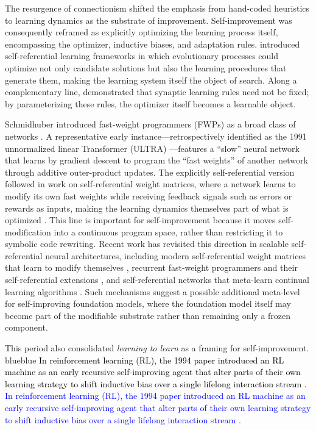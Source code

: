 \documentclass{article}
\let\oldtextcolor\textcolor
\renewcommand{\textcolor}[2]{
  \def\temp{#1}
  \def\red{blue}
  \ifx\temp\red
    \oldtextcolor{black}{#2}
  \else
    \oldtextcolor{#1}{#2}
  \fi
}
\begin{document}
The resurgence of connectionism shifted the emphasis from hand-coded heuristics to learning dynamics as the substrate of improvement. 
Self-improvement was consequently reframed as explicitly optimizing the learning process itself, encompassing the optimizer, inductive biases, and adaptation rules. \citet{schmidhuber1987selfreferential} introduced self-referential learning frameworks in which evolutionary processes could optimize not only candidate solutions but also the learning procedures that generate them, making the learning system itself the object of search. Along a complementary line, \citet{bengio1990learning}  demonstrated that synaptic learning rules need not be fixed; by parameterizing these rules, the optimizer itself becomes a learnable object.




Schmidhuber introduced fast-weight programmers (FWPs) as a broad class of networks \citep{Schmidhuber:91fastweights, schmidhuber1992learning, schmidhuber1993self}. A representative early instance—retrospectively identified as the 1991 unnormalized linear Transformer (ULTRA) \citep{schlag2021linear}—features a “slow” neural network that learns by gradient descent to program the “fast weights” of another network through additive outer-product updates. The explicitly self-referential version followed in work on self-referential weight matrices, where a network learns to modify its own fast weights while receiving feedback signals such as errors or rewards as inputs, making the learning dynamics themselves part of what is optimized \citep{schmidhuber1993self}. This line is important for self-improvement because it moves self-modification into a continuous program space, rather than restricting it to symbolic code rewriting. Recent work has revisited this direction in scalable self-referential neural architectures, including modern self-referential weight matrices that learn to modify themselves \citep{irie2022modern}, recurrent fast-weight programmers and their self-referential extensions \citep{irie2023practicalcomputationalpowerlinear, irie2021goinglineartransformersrecurrent}, and self-referential networks that meta-learn continual learning algorithms \citep{irie2025metalearningcontinuallearningalgorithms}. Such mechanisms suggest a possible additional meta-level for self-improving foundation models, where the foundation model itself may become part of the modifiable substrate rather than remaining only a frozen component.


This period also consolidated \textit{learning to learn} as a framing for self-improvement. \textcolor{blue}{In reinforcement learning (RL), the 1994 paper introduced an RL machine as an early recursive self-improving agent that alter parts of their own learning strategy to shift inductive bias over a single lifelong interaction stream \citep{Schmidhuber1994OnLH}.} 
\end{document}
